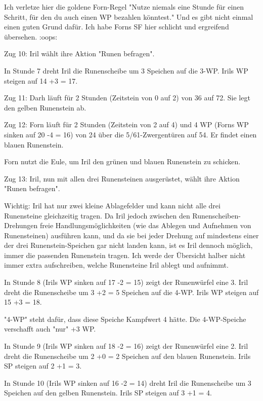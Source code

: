 \documentclass[10pt, a4paper, oneside]{book}
\begin{document}
{Ich verletze hier die goldene Forn-Regel "Nutze niemals eine Stunde für einen Schritt, für den du auch einen WP bezahlen könntest." Und es gibt nicht einmal einen guten Grund dafür. Ich habe Forns SF hier schlicht und ergreifend übersehen. :oops:



Zug 10: Iril wählt ihre Aktion "Runen befragen".

In Stunde 7 dreht Iril die Runenscheibe um 3 Speichen auf die 3-WP. Irils WP steigen auf 14 +3 = 17.



Zug 11: Darh läuft für 2 Stunden (Zeitstein von 0 auf 2) von 36 auf 72. Sie legt den gelben Runenstein ab.



Zug 12: Forn läuft für 2 Stunden (Zeitstein von 2 auf 4) und 4 WP (Forns WP sinken auf 20 -4 = 16) von 24 über die 5/61-Zwergentüren auf 54. Er findet einen blauen Runenstein.

Forn nutzt die Eule, um Iril den grünen und blauen Runenstein zu schicken.



Zug 13: Iril, nun mit allen drei Runensteinen ausgerüstet, wählt ihre Aktion "Runen befragen".

Wichtig: Iril hat nur zwei kleine Ablagefelder und kann nicht alle drei Runensteine gleichzeitig tragen. Da Iril jedoch zwischen den Runenscheiben-Drehungen freie Handlungsmöglichkeiten (wie das Ablegen und Aufnehmen von Runensteinen) ausführen kann, und da sie bei jeder Drehung auf mindestens einer der drei Runenstein-Speichen gar nicht landen kann, ist es Iril dennoch möglich, immer die passenden Runenstein tragen. Ich werde der Übersicht halber nicht immer extra aufschreiben, welche Runensteine Iril ablegt und aufnimmt.

In Stunde 8 (Irils WP sinken auf 17 -2 = 15) zeigt der Runenwürfel eine 3. Iril dreht die Runenscheibe um 3 +2 = 5 Speichen auf die 4-WP. Irils WP steigen auf 15 +3 = 18.

"4-WP" steht dafür, dass diese Speiche Kampfwert 4 hätte. Die 4-WP-Speiche verschafft auch "nur" +3 WP.

In Stunde 9 (Irils WP sinken auf 18 -2 = 16) zeigt der Runenwürfel eine 2. Iril dreht die Runenscheibe um 2 +0 = 2 Speichen auf den blauen Runenstein. Irils SP steigen auf 2 +1 = 3.

In Stunde 10 (Irils WP sinken auf 16 -2 = 14) dreht Iril die Runenscheibe um 3 Speichen auf den gelben Runenstein. Irils SP steigen auf 3 +1 = 4.



}
\end{document}
